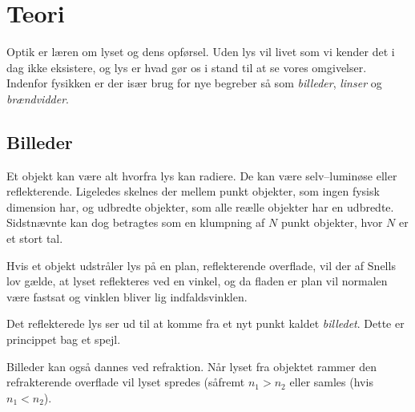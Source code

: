 \section{Teori}
Optik er læren om lyset og dens opførsel. Uden lys vil livet som vi kender det i dag ikke eksistere, og lys er hvad gør os i stand til at se vores omgivelser. Indenfor fysikken er der især brug for nye begreber så som \emph{billeder}, \emph{linser} og \emph{brændvidder}.

\subsection{Billeder} 
Et objekt kan være alt hvorfra lys kan radiere. De kan være selv--luminøse eller reflekterende. Ligeledes skelnes der mellem punkt objekter, som ingen fysisk dimension har, og udbredte objekter, som alle reælle objekter har en udbredte. Sidstnævnte kan dog betragtes som en klumpning af $N$ punkt objekter, hvor $N$ er et stort tal.

Hvis et objekt udstråler lys på en plan, reflekterende overflade, vil der af Snells lov gælde, at lyset reflekteres ved en vinkel, og da fladen er plan vil normalen være fastsat og vinklen bliver lig indfaldsvinklen.  

Det reflekterede lys ser ud til at komme fra et nyt punkt kaldet \emph{billedet}.
Dette er princippet bag et spejl.

Billeder kan også dannes ved refraktion. Når lyset fra objektet rammer den refrakterende overflade vil lyset spredes (såfremt $n_1 > n_2$ eller samles (hvis $n_1 < n_2$).
